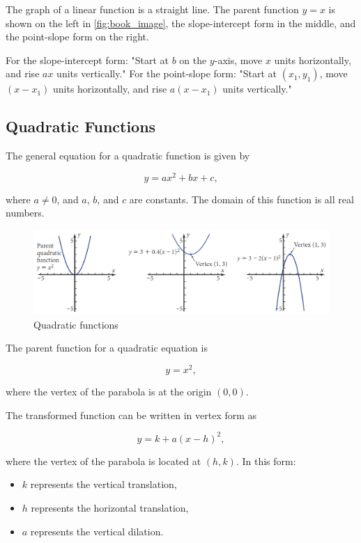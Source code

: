 The graph of a linear function is a straight line. The parent function \(y = x\) is shown on the left in \autoref{fig:book_image}, the slope-intercept form in the middle, and the point-slope form on the right.

For the slope-intercept form: "Start at \(b\) on the \(y\)-axis, move \(x\) units horizontally, and rise \(ax\) units vertically." For the point-slope form: "Start at \((x_1, y_1)\), move \((x - x_1)\) units horizontally, and rise \(a(x - x_1)\) units vertically."

\subsection*{Quadratic Functions}
The general equation for a quadratic function is given by

\[
y = ax^2 + bx + c,
\]

where \(a \neq 0\), and \(a\), \(b\), and \(c\) are constants. The domain of this function is all real numbers.

\begin{figure}[htbp]
    \centering
    \includegraphics[width=1\textwidth]{figure/book2.png} %
    \caption{Quadratic functions}
    \label{fig:book_image2}
\end{figure}

The parent function for a quadratic equation is

\[
y = x^2,
\]

where the vertex of the parabola is at the origin \((0, 0)\).

The transformed function can be written in vertex form as

\[
y = k + a(x-h)^2,
\]

where the vertex of the parabola is located at \((h, k)\). In this form:
\begin{itemize}
    \item \(k\) represents the vertical translation,
    \item \(h\) represents the horizontal translation,
    \item \(a\) represents the vertical dilation.
\end{itemize}

